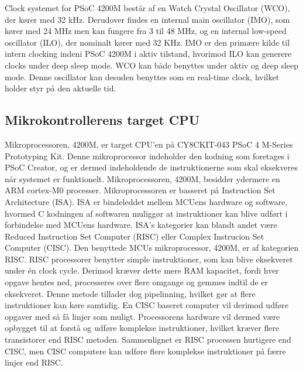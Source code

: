 Clock systemet for PSoC 4200M består af en Watch Crystal Oscillator (WCO), der kører med 32 kHz. Derudover findes en internal main oscillator (IMO), som kører med 24 MHz men kan fungere fra 3 til 48 MHz, og en internal low-speed oscillator (ILO), der nominalt kører med 32 KHz. IMO er den primære kilde til intern clocking indeni PSoC 4200M i aktiv tilstand, hvorimod ILO kan generere clocks under deep sleep mode. WCO kan både benyttes under aktiv og deep sleep mode. Denne oscillator kan desuden benyttes som en real-time clock, hvilket holder styr på den aktuelle tid. \citep{Semiconductor20164200M}

\subsection{Mikrokontrollerens target CPU}
Mikroprocessoren, 4200M, er target CPU'en på CY8CKIT-043 PSoC 4 M-Series Prototyping Kit. Denne mikroprocessor indeholder den kodning som foretages i PSoC Creator, og er dermed indeholdende de instruktionerne som skal eksekveres når systemet er funktionelt. Mikroprocessoren, 4200M, besidder ydermere en ARM cortex-M0 processer. \newline
Mikroprocessoren er basseret på Instruction Set Architecture (ISA). ISA er bindeleddet mellem MCUens hardware og software, hvormed C kodningen af softwaren muliggør at instruktioner kan blive udført i forbindelse med MCUens hardware. ISA's kategorier kan blandt andet være Reduced Instruction Set Computer (RISC) eller Complex Instrucion Set Computer (CISC). \citep{CYPRESS2016Cortexm0,Semiconductor20164200M,Yadav2016} \newline
Den benyttede MCUs mikroprocessor, 4200M, er af kategorien RISC. RISC processorer benytter simple instruktioner, som kan blive eksekveret under én clock cycle. Derimod kræver dette mere RAM kapacitet, fordi hver opgave hentes ned, processeres over flere omgange og gemmes indtil de er eksekveret. Denne metode tillader dog pipelinning, hvilket gør at flere instruktioner kan køre samtidig. En CISC baseret computer vil derimod udføre opgaver med så få linjer som muligt. Processorens hardware vil dermed være opbygget til at forstå og udføre komplekse instruktioner, hvilket kræver flere transistorer end RISC metoden.  Sammenlignet er RISC processen hurtigere end CISC, men CISC computere kan udføre flere komplekse instruktioner på færre linjer end RISC. \citep{CYPRESS2016Cortexm0,Semiconductor20164200M,Yadav2016}\\
